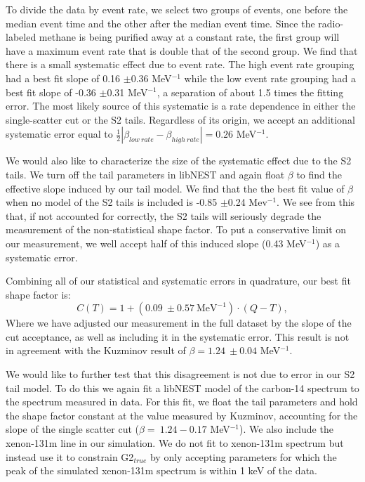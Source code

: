 To divide the data by event rate, we select two groups of events, one before the median event time and the other after the median event time. Since the radio-labeled methane is being purified away at a constant rate, the first group will have a maximum event rate that is double that of the second group. We find that there is a small systematic effect due to event rate. The high event rate grouping had a best fit slope of 0.16 $\pm$0.36 MeV$^{-1}$ while the low event rate grouping had a best fit slope of -0.36 $\pm$0.31 MeV$^{-1}$, a separation of about 1.5 times the fitting error. The most likely source of this systematic is a rate dependence in either the single-scatter cut or the S2 tails. Regardless of its origin, we accept an additional systematic error equal to $\frac{1}{2}|\beta_{low \ rate}-\beta_{high \ rate}|=0.26$ MeV$^{-1}$. 

We would also like to characterize the size of the systematic effect due to the S2 tails. We turn off the tail parameters in libNEST and again float $\beta$ to find the effective slope induced by our tail model. We find that the the best fit value of $\beta$ when no model of the S2 tails is included is -0.85 $\pm$0.24 Mev$^{-1}$. We see from this that, if not accounted for correctly, the S2 tails will seriously degrade the measurement of the non-statistical shape factor. To put a conservative limit on our measurement, we well accept half of this induced slope (0.43 MeV$^{-1}$) as a systematic error.

Combining all of our statistical and systematic errors in quadrature, our best fit shape factor is:
\begin{equation}
C(T)=1+(0.09 \ \pm0.57 \ \text{MeV}^{-1})\cdot(Q-T),
\end{equation}
Where we have adjusted our measurement in the full dataset by the slope of the cut acceptance, as well as including it in the systematic error. This result is not in agreement with the Kuzminov result of $\beta=1.24 \ \pm0.04$ MeV$^{-1}$. 

We would like to further test that this disagreement is not due to error in our S2 tail model. To do this we again fit a libNEST model of the carbon-14 spectrum to the spectrum measured in data. For this fit, we float the tail parameters and hold the shape factor constant at the value measured by Kuzminov, accounting for the slope of the single scatter cut ($\beta = \ 1.24-0.17$ MeV$^{-1}$). We also include the xenon-131m line in our simulation. We do not fit to xenon-131m spectrum but instead use it to constrain G2$_{true}$ by only accepting parameters for which the peak of the simulated xenon-131m spectrum is within 1 keV of the data. 

